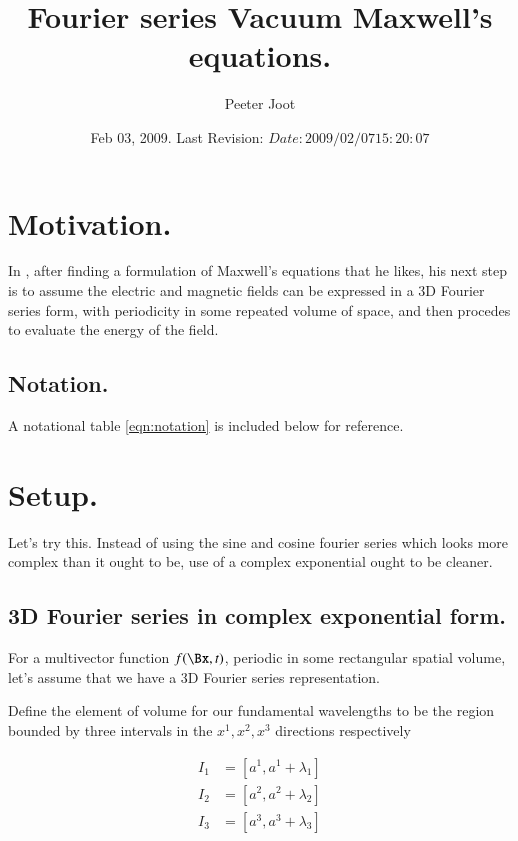 \documentclass{article}
\title{ Fourier series Vacuum Maxwell's equations. }
\author{Peeter Joot}
\date{ Feb 03, 2009.  Last Revision: $Date: 2009/02/07 15:20:07 $ }
\begin{document}
\maketitle{}

\tableofcontents

\section{ Motivation. }

In \cite{bohm1989qt}, 
after finding a formulation of Maxwell's equations that he likes, his next
step is to assume the electric and magnetic fields can be expressed in 
a 3D Fourier series form, with periodicity in some repeated volume 
of space, and then procedes to evaluate the energy of the 
field.

\subsection{ Notation. }

A notational table 
\ref{eqn:notation}
is included below for reference.

\section{ Setup. }

Let's try this.  Instead of using the sine and cosine fourier series
which looks more complex than it ought to be, use of a complex exponential
ought to be cleaner.

\subsection{ 3D Fourier series in complex exponential form. }

For a multivector function $f(\Bx, t)$, periodic in some rectangular spatial volume, let's assume that we have a
3D Fourier series representation.

Define the element of volume for our fundamental wavelengths to be the region bounded by three intervals in the $x^1, x^2, x^3$ directions respectively

\begin{align*}
I_1 &= [ a^1, a^1 + \lambda_1 ] \\
I_2 &= [ a^2, a^2 + \lambda_2 ] \\
I_3 &= [ a^3, a^3 + \lambda_3 ] \\
\end{align*}
\end{document}
